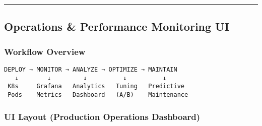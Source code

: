 \documentclass[
]{article}
\begin{document}
\begin{center}\rule{0.5\linewidth}{0.5pt}\end{center}

\hypertarget{operations-performance-monitoring-ui}{%
\subsection{Operations \& Performance Monitoring
UI}\label{operations-performance-monitoring-ui}}

\hypertarget{workflow-overview-6}{%
\subsubsection{Workflow Overview}\label{workflow-overview-6}}

\begin{verbatim}
DEPLOY → MONITOR → ANALYZE → OPTIMIZE → MAINTAIN
   ↓        ↓         ↓          ↓          ↓
 K8s     Grafana   Analytics   Tuning   Predictive
 Pods    Metrics   Dashboard   (A/B)    Maintenance
\end{verbatim}

\hypertarget{ui-layout-production-operations-dashboard}{%
\subsubsection{UI Layout (Production Operations
Dashboard)}\label{ui-layout-production-operations-dashboard}}
\end{document}
